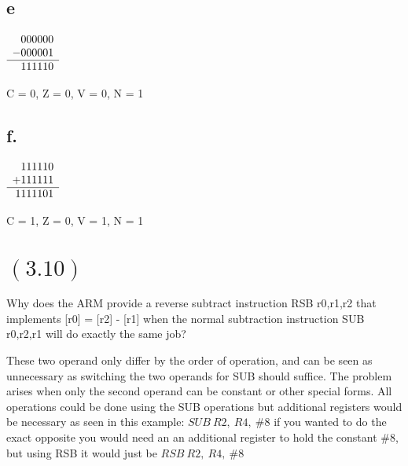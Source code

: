 \documentclass[letterpaper,12pt,titlepage]{article}
\begin{document}
\subsection*{e}

$\begin{array}[t]{r}
   000000 \\
  -000001 \\\hline
   111110 \\
\end{array}$

\begin{mdframed}[style=MyFrame]
C = 0,
Z = 0,
V = 0,
N = 1
\end{mdframed}

\subsection*{f.}

$\begin{array}[t]{r}
   111110 \\
  +111111 \\\hline
  1111101 \\
\end{array}$

\begin{mdframed}[style=MyFrame]
C = 1,
Z = 0,
V = 1,
N = 1
\end{mdframed}

\section*{$(3.10)$} Why does the ARM provide a reverse subtract instruction RSB r0,r1,r2 that implements [r0] = [r2] - [r1] when the normal subtraction instruction SUB r0,r2,r1 will do exactly the same job? \newline

\begin{mdframed}[style=MyFrame]
These two operand only differ by the order of operation, and can be seen as unnecessary as switching the two operands for SUB should suffice. The problem arises when only the second operand can be constant or other special forms. All operations could be done using the SUB operations but additional registers would be necessary as seen  in this example: $SUB~R2,~R4,~\#8$ if you wanted to do the exact opposite you would need an an additional register to hold the constant $\#8$, but using RSB it would just be $RSB~R2,~R4,~\#8$
\end{mdframed}
\end{document}
